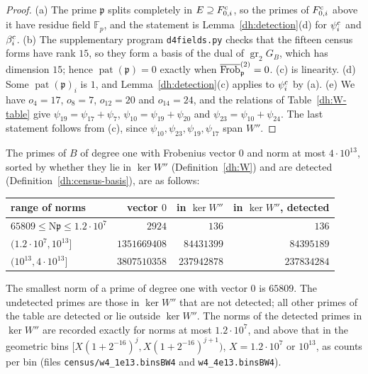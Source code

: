 \begin{proof}
(a) The prime $\mathfrak p$ splits completely in $E\supseteq F^{\rm c}_{0,i}$, so the
primes of $F^{\rm c}_{0,i}$ above it have residue field $\mathbb F_p$, and the
statement is Lemma~\ref{dh:detection}(d) for $\psi^{\rm c}_i$ and $\beta^{\rm c}_i$.
(b) The supplementary program \texttt{d4fields.py} checks that the fifteen
census forms have rank $15$, so they form a basis of the dual of
$\operatorname{gr}_2G_B$, which has dimension $15$; hence
$\operatorname{pat}(\mathfrak p)=0$ exactly when
$\overline{\operatorname{Frob}}^{(2)}_{\mathfrak p}=0$. (c) is linearity. (d) Some
$\operatorname{pat}(\mathfrak p)_i$ is $1$, and Lemma~\ref{dh:detection}(c)
applies to $\psi^{\rm c}_i$ by (a). (e) We have $o_4=17$, $o_8=7$, $o_{12}=20$
and $o_{14}=24$, and the relations of Table~\ref{dh:W-table} give
$\psi_{19}=\psi_{17}+\psi_7$, $\psi_{10}=\psi_{19}+\psi_{20}$ and
$\psi_{23}=\psi_{10}+\psi_{24}$. The last statement follows from (c), since
$\psi_{10},\psi_{23},\psi_{19},\psi_{17}$ span $W''$.
\end{proof}

\begin{proposition}\label{dh:census}
The primes of $B$ of degree one with Frobenius vector $0$ and norm at most
$4\cdot10^{13}$, sorted by whether they lie in $\ker W''$
(Definition~\ref{dh:W}) and are detected (Definition~\ref{dh:census-basis}),
are as follows:
\begin{center}\small
\begin{tabular}{lrrr}
\toprule
range of norms & vector $0$ & in $\ker W''$ & in $\ker W''$, detected\\
\midrule
$65809\le\mathrm N\mathfrak p\le1.2\cdot10^7$ & $2924$ & $136$ & $136$\\
$(1.2\cdot10^7,10^{13}]$ & $1351669408$ & $84431399$ & $84395189$\\
$(10^{13},4\cdot10^{13}]$ & $3807510358$ & $237942878$ & $237834284$\\
\bottomrule
\end{tabular}
\end{center}
The smallest norm of a prime of degree one with vector $0$ is $65809$. The
undetected primes are those in $\ker W''$ that are not detected; all
other primes of the table are detected or lie outside $\ker W''$. The norms of
the detected primes in $\ker W''$ are recorded exactly for norms at most
$1.2\cdot10^7$, and above that in the geometric bins
$[X(1+2^{-16})^j,X(1+2^{-16})^{j+1})$, $X=1.2\cdot10^7$ or $10^{13}$, as counts
per bin (files \texttt{census/w4\_1e13.binsBW4} and
\texttt{w4\_4e13.binsBW4}).
\end{proposition}

